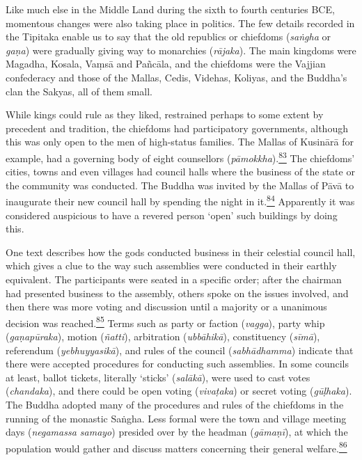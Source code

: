 Like much else in the Middle Land during the sixth to fourth centuries
BCE, momentous changes were also taking place in politics. The few
details recorded in the Tipitaka enable us to say that the old republics
or chiefdoms (\emph{saṅgha} or \emph{gaṇa}) were gradually giving way to
monarchies (\emph{rājaka}). The main kingdoms were Magadha, Kosala,
Vaṃsā and Pañcāla, and the chiefdoms were the Vajjian confederacy and
those of the Mallas, Cedis, Videhas, Koliyas, and the Buddha's clan the
Sakyas, all of them small.

While kings could rule as they liked, restrained perhaps to some extent
by precedent and tradition, the chiefdoms had participatory governments,
although this was only open to the men of high-status families. The
Mallas of Kusinārā for example, had a governing body of eight
counsellors
(\emph{pāmokkha}).\label{footprints_split_006.html_fnref83}\hyperref[footprints_split_024.htmlux5cux23fn83]{\textsuperscript{83}}
The chiefdoms' cities, towns and even villages had council halls where
the business of the state or the community was conducted. The Buddha was
invited by the Mallas of Pāvā to inaugurate their new council hall by
spending the night in
it.\label{footprints_split_006.html_fnref84}\hyperref[footprints_split_024.htmlux5cux23fn84]{\textsuperscript{84}}
Apparently it was considered auspicious to have a revered person `open'
such buildings by doing this.

One text describes how the gods conducted business in their celestial
council hall, which gives a clue to the way such assemblies were
conducted in their earthly equivalent. The participants were seated in a
specific order; after the chairman had presented business to the
assembly, others spoke on the issues involved, and then there was more
voting and discussion until a majority or a unanimous decision was
reached.\label{footprints_split_006.html_fnref85}\hyperref[footprints_split_024.htmlux5cux23fn85]{\textsuperscript{85}}
Terms such as party or faction (\emph{vagga}), party whip
(\emph{gaṇapūraka}), motion (\emph{ñatti}), arbitration
(\emph{ubbāhikā}), constituency (\emph{sīmā}), referendum
(\emph{yebhuyyasikā}), and rules of the council (\emph{sabhādhamma})
indicate that there were accepted procedures for conducting such
assemblies. In some councils at least, ballot tickets, literally
`sticks' (\emph{salākā}), were used to cast votes (\emph{chandaka}), and
there could be open voting (\emph{vivaṭaka}) or secret voting
(\emph{gūḷhaka}). The Buddha adopted many of the procedures and rules of
the chiefdoms in the running of the monastic Saṅgha. Less formal were
the town and village meeting days (\emph{negamassa samayo}) presided
over by the headman (\emph{gāmaṇī}), at which the population would
gather and discuss matters concerning their general
welfare.\label{footprints_split_006.html_fnref86}\hyperref[footprints_split_024.htmlux5cux23fn86]{\textsuperscript{86}}

